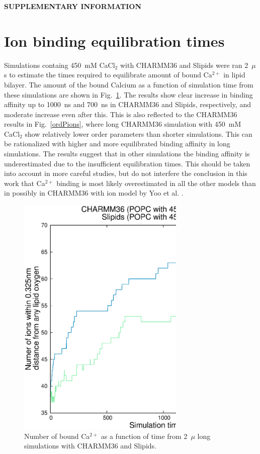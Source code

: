 \documentclass[pre,aps,floatfix,authordate1-4,twocolumn]{revtex4-1}
\begin{document}
\newpage

\appendix
\begin{center}
{\bf SUPPLEMENTARY INFORMATION}
\end{center}
\section{Ion binding equilibration times}
Simulations containg 450~mM CaCl$_2$ with CHARMM36 and Slipids were ran 2~$\mu$s to estimate the times
required to equilibrate amount of bound Ca$^{2+}$ in lipid bilayer. The amount of the bound Calcium
as a function of simulation time from these simulations are shown in Fig.~\ref{longruns}.
The results show clear increase in binding affinity up to 1000~ns and 700~ns in CHARMM36 and Slipids, respectively,
and moderate increase even after this. This is also reflected to the CHARMM36 results in Fig.~\ref{ordPions}, where
long CHARMM36 simulation with 450~mM CaCl$_2$ show relatively lower order parameters than shorter simulations. 
This can be rationalized with higher and more equilibrated binding affinity in long simulations. 
The results suggest that in other simulations the binding affinity 
is underestimated due to the insufficient equilibration times. This should be taken into account in more careful studies,
but do not interfere the conclusion in this work that Ca$^{2+}$ binding is most likely overestimated in all the
other models than in possibly in CHARMM36 with ion model by Yoo et al. \cite{yoo16}.
\begin{figure}[]
  \centering
  \includegraphics[width=8cm]{../Fig/bindingINlongRUNS.eps} 
  \caption{\label{longruns}
    Number of bound Ca$^{2+}$ as a function of time from 2~$\mu$ long simulations with CHARMM36 and Slipids.
}
\end{figure}
\end{document}
